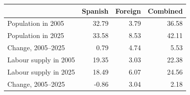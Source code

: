 \begin{tabular*}{\textwidth}{@{\extracolsep{\fill}}lrrr}
\toprule
\multicolumn{1}{l}{}&\multicolumn{1}{r}{Spanish}&\multicolumn{1}{r}{Foreign}&\multicolumn{1}{r}{Combined}\tabularnewline
\midrule
Population in 2005&32.79&3.79&36.58\tabularnewline
Population in 2025&33.58&8.53&42.11\tabularnewline
Change, 2005--2025&0.79&4.74&5.53\tabularnewline
Labour supply in 2005&19.35&3.03&22.38\tabularnewline
Labour supply in 2025&18.49&6.07&24.56\tabularnewline
Change, 2005--2025&-0.86&3.04&2.18\tabularnewline
\bottomrule
\end{tabular*}
